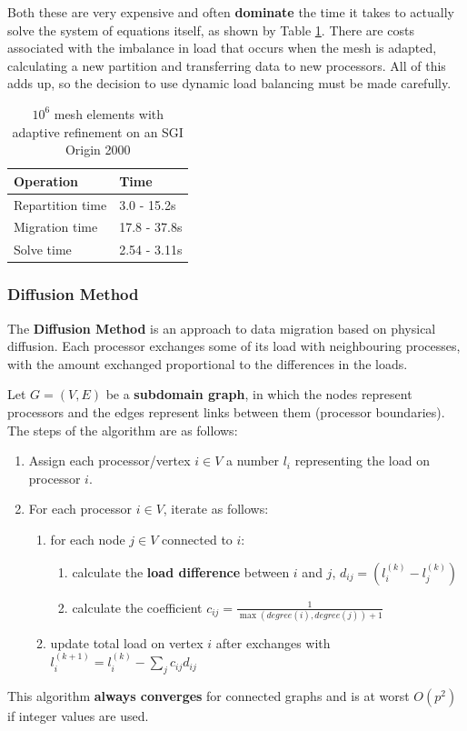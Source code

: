 \documentclass{article}
\begin{document}
Both these are very expensive and often \textbf{dominate} the time it takes to actually solve the system of equations itself, as shown by Table \ref{tab:dynamic-load-balancing-costs}. There are costs associated with the imbalance in load that occurs when the mesh is adapted, calculating a new partition and transferring data to new processors. All of this adds up, so the decision to use dynamic load balancing must be made carefully.

\begin{table}
	\centering
	\begin{tabular}{|l|l|}
		\hline
		\textbf{Operation} & \textbf{Time} \\
		\hline
		Repartition time & 3.0 - 15.2s \\
		Migration time & 17.8 - 37.8s \\
		Solve time & 2.54 - 3.11s \\
		\hline
	\end{tabular}
	\caption{$10^6$ mesh elements with adaptive refinement on an SGI Origin 2000}
	\label{tab:dynamic-load-balancing-costs}
\end{table}

\subsubsection{Diffusion Method}

The \textbf{Diffusion Method} is an approach to data migration based on physical diffusion. Each processor exchanges some of its load with neighbouring processes, with the amount exchanged proportional to the differences in the loads.

Let $G = (V, E)$ be a \textbf{subdomain graph}, in which the nodes represent processors and the edges represent links between them (processor boundaries). The steps of the algorithm are as follows:
\begin{enumerate}
	\item Assign each processor/vertex $i \in V$ a number $l_i$ representing the load on processor $i$.
	 \item For each processor $i \in V$, iterate as follows:
	 \begin{enumerate}
	 	\item for each node $j \in V$ connected to $i$:
	 		\begin{enumerate}
	 			\item calculate the \textbf{load difference} between $i$ and $j$, $d_{ij} = (l_i^{(k)} - l_j^{(k)})$
	 			\item calculate the coefficient $c_{ij} = \frac{1}{\max (degree(i), degree(j)) + 1}$
	 		\end{enumerate}	 		
	 	\item update total load on vertex $i$ after exchanges with $l_i^{(k+1)} = l_i^{(k)} - \sum_j {c_{ij}d_{ij}}$
	 \end{enumerate}
\end{enumerate}
This algorithm \textbf{always converges} for connected graphs and is at worst $O(p^2)$ if integer values are used.
\end{document}
